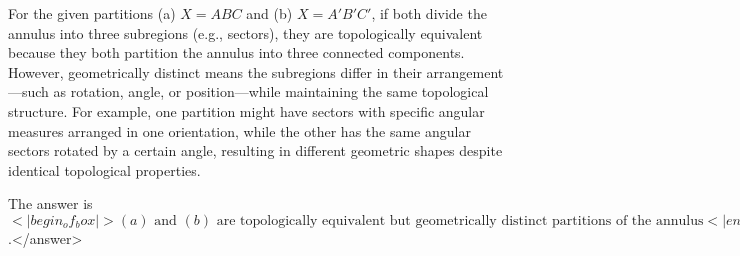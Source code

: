 For the given partitions (a) \(X = ABC\) and (b) \(X = A'B'C'\), if both divide the annulus into three subregions (e.g., sectors), they are topologically equivalent because they both partition the annulus into three connected components. However, geometrically distinct means the subregions differ in their arrangement—such as rotation, angle, or position—while maintaining the same topological structure. For example, one partition might have sectors with specific angular measures arranged in one orientation, while the other has the same angular sectors rotated by a certain angle, resulting in different geometric shapes despite identical topological properties.  

The answer is \(<|begin_of_box|>(a) \text{ and } (b) \text{ are topologically equivalent but geometrically distinct partitions of the annulus}<|end_of_box|>\).</answer>